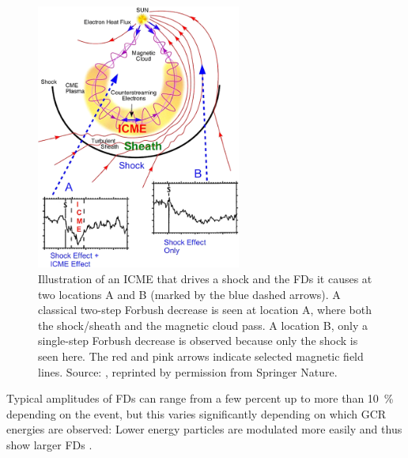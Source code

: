 \begin{figure}
	\centering
	\includegraphics[width=0.6\textwidth]{images/richardson_cane_2011_icme.png}
	\caption[Illustration of ICMEs and Forbush decreases]{Illustration of an \ac{ICME} that drives a shock and the \acp{FD} it causes at two locations A and B (marked by the blue dashed arrows). A classical two-step Forbush decrease is seen at location A, where both the shock/sheath and the magnetic cloud pass. A location B, only a single-step Forbush decrease is observed because only the shock is seen here. The red and pink arrows indicate selected magnetic field lines. Source: \citet[Figure 1]{Richardson-Cane-2011}, reprinted by permission from Springer Nature.}
	\label{fig:richardsoncane-cme}
\end{figure}
Typical amplitudes of \acp{FD} can range from a few percent up to more than \SI{10}{\percent} depending on the event, but this varies significantly depending on which \ac{GCR} energies are observed: Lower energy particles are modulated more easily and thus show larger \acp{FD} \citep[e.g.][]{Lockwood1971,Lockwood1991}.

